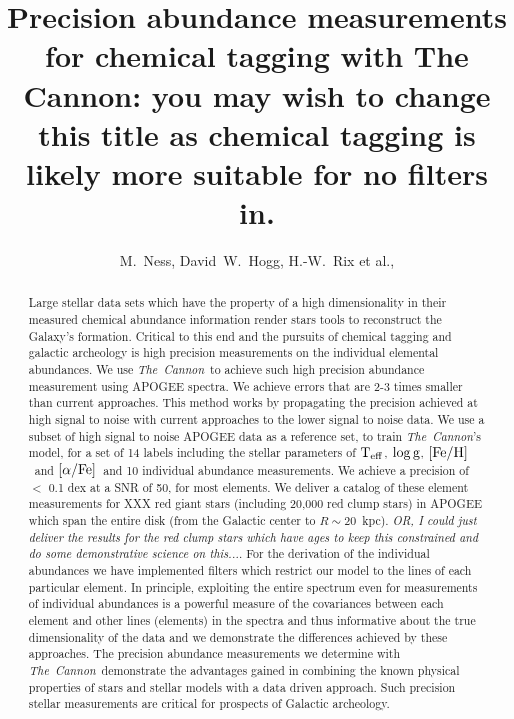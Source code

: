 \documentclass[12pt, preprint]{aastex}
\newcommand{\project}[1]{\textsl{#1}}
\newcommand{\tc}{\project{The~Cannon}}
\newcommand{\teff}{\mbox{$\rm T_{eff}$}}
\newcommand{\feh}{\mbox{$\rm [Fe/H]$}}
\newcommand{\alphafe}{\mbox{$\rm [\alpha/Fe]$}}
\newcommand{\logg}{\mbox{$\rm \log g$}}
\begin{document}
\title{Precision abundance measurements for chemical tagging with The Cannon: you may wish to change this title as chemical tagging is likely more suitable for no filters in. }
\author{M.~Ness,
        David~W.~Hogg,
        H.-W.~Rix et al.,}


\begin{abstract}%
Large stellar data sets which have the property of a high dimensionality in their measured chemical abundance information render stars tools to reconstruct the Galaxy's formation. Critical to this end and the pursuits of chemical tagging and galactic archeology is high precision measurements on the individual elemental abundances. We use \tc\ to achieve such high precision abundance measurement using APOGEE spectra. We achieve errors that are 2-3 times smaller than current approaches.  This method works by propagating the precision achieved at high signal to noise with current approaches to the lower signal to noise data. We use a subset of high signal to noise APOGEE data as a reference set, to train \tc's model, for a set of 14 labels including the stellar parameters of \teff, \logg, \feh\ and \alphafe\ and 10 individual abundance measurements. We achieve a precision of $<$ 0.1 dex at a SNR of 50, for most elements.  We deliver a catalog of these element measurements for XXX red giant stars (including 20,000 red clump stars) in APOGEE which span the entire disk (from the Galactic center to $R\sim 20$~kpc). \textit{OR, I could just deliver the results for the red clump stars which have ages to keep this constrained and do some demonstrative science on this...}. 
For the derivation of the individual abundances we have implemented filters which restrict our model to the lines of each particular element. In principle, exploiting the entire spectrum even for measurements of individual abundances is a powerful measure of the covariances between each element and other lines (elements) in the spectra and thus informative about the true dimensionality of the data and we demonstrate the differences achieved by these approaches. The precision abundance measurements we determine with \tc\ demonstrate the advantages gained in combining the known physical properties of stars and stellar models with a data driven approach. Such precision stellar measurements are critical for prospects of Galactic archeology.


\end{abstract}
\end{document}

